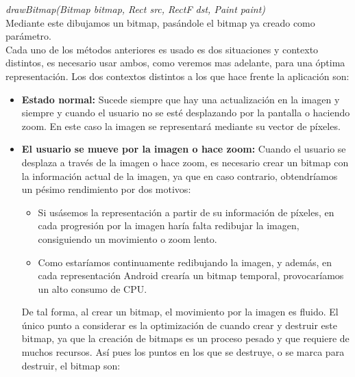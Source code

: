 \emph{drawBitmap(Bitmap bitmap, Rect src, RectF dst, Paint paint)}\\

Mediante este dibujamos un bitmap, pasándole el bitmap ya creado como parámetro.\\

Cada uno de los métodos anteriores es usado es dos situaciones y contexto distintos, es necesario usar ambos, como veremos mas adelante, para una óptima representación. Los dos contextos distintos a los que hace frente la aplicación son:\\

\begin{itemize}
\item \textbf{Estado normal:} Sucede siempre que hay una actualización en la imagen y siempre y cuando el usuario no se esté desplazando por la pantalla o haciendo zoom. En este caso la imagen se representará mediante su vector de píxeles.

\item \textbf{El usuario se mueve por la imagen o hace zoom:} Cuando el usuario se desplaza a través de la imagen o hace zoom, es necesario crear un bitmap con la información actual de la imagen, ya que en caso contrario, obtendríamos un pésimo rendimiento por dos motivos:

\begin{itemize}
\item Si usásemos la representación a partir de su información de     píxeles, en cada progresión por la imagen haría falta redibujar     la imagen, consiguiendo un movimiento o zoom lento.
\item Como estaríamos continuamente redibujando la imagen, y además, en     cada representación Android crearía un bitmap temporal,     provocaríamos un alto consumo de CPU.\\
\end{itemize}

De tal forma, al crear un bitmap, el movimiento por la imagen es fluido. El único punto a considerar es la optimización de cuando crear y destruir este bitmap, ya que la creación de bitmaps es un proceso pesado y que requiere de muchos recursos. Así pues los puntos en los que se destruye, o se marca para destruir, el bitmap son:


\end{itemize}
